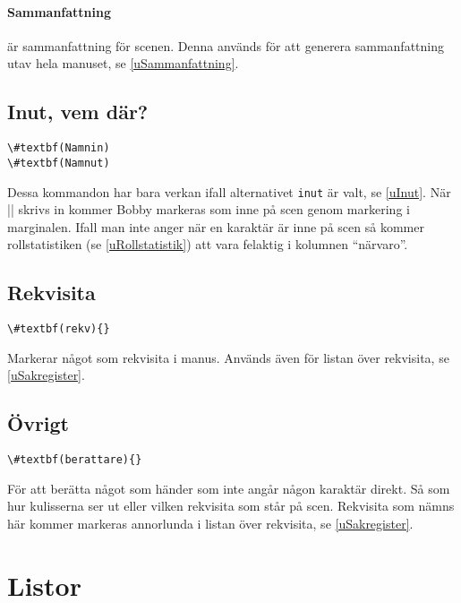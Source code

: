 \documentclass{article}
\newcommand{\citat}[1]{``#1''}
\begin{document}
\paragraph{Sammanfattning} är sammanfattning för scenen. Denna används för att generera sammanfattning utav hela manuset, se \ref{uSammanfattning}.


\subsection{Inut, vem där?}\label{uVemInne}
\begin{Verbatim}[commentchar=!, commandchars=\#\(\),numberblanklines=false]
\#textbf(Namnin) 
\#textbf(Namnut)
\end{Verbatim}
Dessa kommandon har bara verkan ifall alternativet \texttt{inut} är valt, se \ref{uInut}. När |\Bobbyin| skrivs in kommer Bobby markeras som inne på scen genom markering i marginalen. Ifall man inte anger när en karaktär är inne på scen så kommer rollstatistiken (se \ref{uRollstatistik}) att vara felaktig i kolumnen \citat{närvaro}.

\subsection{Rekvisita}
\begin{Verbatim}[commentchar=!, commandchars=\#\(\),numberblanklines=false]
\#textbf(rekv){}
\end{Verbatim}

Markerar något som rekvisita i manus. Används även för listan över rekvisita, se \ref{uSakregister}.


\subsection{Övrigt}
\begin{Verbatim}[commentchar=!, commandchars=\#\(\),numberblanklines=false]
\#textbf(berattare){} 
\end{Verbatim}
För att berätta något som händer som inte angår någon karaktär direkt. Så som hur kulisserna ser ut eller vilken rekvisita som står på scen. Rekvisita som nämns här kommer markeras annorlunda i listan över rekvisita, se \ref{uSakregister}.


\section{Listor} %
\end{document}
